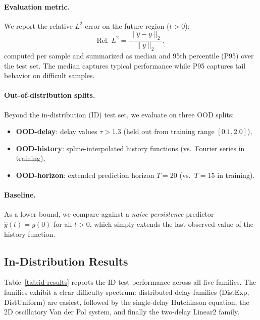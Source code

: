 \paragraph{Evaluation metric.}
We report the relative $L^2$ error on the future region ($t > 0$):
\begin{equation}
  \text{Rel.\ } L^2 = \frac{\|\hat{y} - y\|_2}{\|y\|_2},
\end{equation}
computed per sample and summarized as median and 95th percentile (P95) over
the test set.  The median captures typical performance while P95 captures tail
behavior on difficult samples.

\paragraph{Out-of-distribution splits.}
Beyond the in-distribution (ID) test set, we evaluate on three OOD splits:
\begin{itemize}
  \item \textbf{OOD-delay}: delay values $\tau > 1.3$ (held out from training range $[0.1, 2.0]$),
  \item \textbf{OOD-history}: spline-interpolated history functions (vs.\ Fourier series in training),
  \item \textbf{OOD-horizon}: extended prediction horizon $T = 20$ (vs.\ $T = 15$ in training).
\end{itemize}

\paragraph{Baseline.}
As a lower bound, we compare against a \emph{naive persistence} predictor
$\hat{y}(t) = y(0)$ for all $t > 0$, which simply extends the last observed value
of the history function.

\subsection{In-Distribution Results}

Table~\ref{tab:id-results} reports the ID test performance across all five families.
The families exhibit a clear difficulty spectrum: distributed-delay families
(DistExp, DistUniform) are easiest, followed by the single-delay Hutchinson equation,
the 2D oscillatory Van der Pol system, and finally the two-delay Linear2 family.

